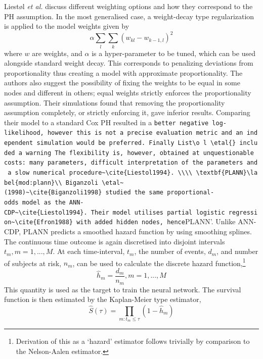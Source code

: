 \documentclass[
  letterpaper,
]{scrbook}
\theoremstyle{plain}
\theoremstyle{definition}
\theoremstyle{remark}
\begin{document}
Liest\o l \textit{et al.}{} discuss different weighting options and how
they correspond to the PH assumption. In the most generalised case, a
weight-decay type regularization is applied to the model weights given
by \[
\alpha \sum_l \sum_k (w_{kl} - w_{k-1,l})^2
\] where \(w\) are weights, and \(\alpha\) is a hyper-parameter to be
tuned, which can be used alongside standard weight decay. This
corresponds to penalizing deviations from proportionality thus creating
a model with approximate proportionality. The authors also suggest the
possibility of fixing the weights to be equal in some nodes and
different in others; equal weights strictly enforces the proportionality
assumption. Their simulations found that removing the proportionality
assumption completely, or strictly enforcing it, gave inferior results.
Comparing their model to a standard Cox PH resulted in a
\texttt{better\textquotesingle{}\ negative\ log-likelihood,\ however\ this\ is\ not\ a\ precise\ evaluation\ metric\ and\ an\ independent\ simulation\ would\ be\ preferred.\ Finally\ List\textbackslash{}o\ l\ \textbackslash{}etal\{\}\ included\ a\ warning\ \textasciigrave{}\textasciigrave{}The\ flexibility\ is,\ however,\ obtained\ at\ unquestionable\ costs:\ many\ parameters,\ difficult\ interpretation\ of\ the\ parameters\ and\ a\ slow\ numerical\ procedure\textquotesingle{}\textquotesingle{}\textasciitilde{}\textbackslash{}cite\{Liestol1994\}.\ \textbackslash{}\textbackslash{}\textbackslash{}\textbackslash{}\ \textbackslash{}textbf\{PLANN\}\textbackslash{}label\{mod:plann\}\textbackslash{}\textbackslash{}\ Biganzoli\ \textbackslash{}etal\textasciitilde{}(1998)\textasciitilde{}\textbackslash{}cite\{Biganzoli1998\}\ studied\ the\ same\ proportional-odds\ model\ as\ the\ ANN-CDP\textasciitilde{}\textbackslash{}cite\{Liestol1994\}.\ Their\ model\ utilises\ partial\ logistic\ regression\textasciitilde{}\textbackslash{}cite\{Efron1988\}\ with\ added\ hidden\ nodes,\ hence}PLANN'.
Unlike ANN-CDP, PLANN predicts a smoothed hazard function by using
smoothing splines. The continuous time outcome is again discretised into
disjoint intervals \(t_m, m = 1,...,M\). At each time-interval, \(t_m\),
the number of events, \(d_m\), and number of subjects at risk, \(n_m\),
can be used to calculate the discrete hazard
function,\footnote{Derivation of this as a `hazard' estimator follows trivially by comparison to the Nelson-Aalen estimator.}
\[
\label{eq:surv_dischaz}
\hat{h}_m = \frac{d_m}{n_m}, m = 1,...,M
\] This quantity is used as the target to train the neural network. The
survival function is then estimated by the Kaplan-Meier type estimator,
\[
\label{eq:surv_discreteKM}
\hat{S}(\tau) = \prod_{m:t_m \leq \tau} (1 - \hat{h}_m)
\]
\end{document}
